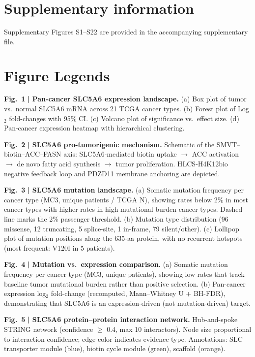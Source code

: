 \documentclass[10pt,letterpaper]{article}
\begin{document}
\section*{Supplementary information}
Supplementary Figures S1--S22 are provided in the accompanying supplementary file.


\clearpage
\section*{Figure Legends}

\noindent\textbf{Fig.~1} \textbf{| Pan-cancer SLC5A6 expression landscape.} (a) Box plot of tumor vs.\ normal SLC5A6 mRNA across 21 TCGA cancer types. (b) Forest plot of Log$_2$ fold-changes with 95\% CI. (c) Volcano plot of significance vs.\ effect size. (d) Pan-cancer expression heatmap with hierarchical clustering.

\noindent\textbf{Fig.~2} \textbf{| SLC5A6 pro-tumorigenic mechanism.} Schematic of the SMVT--biotin--ACC--FASN axis: SLC5A6-mediated biotin uptake $\rightarrow$ ACC activation $\rightarrow$ de novo fatty acid synthesis $\rightarrow$ tumor proliferation. HLCS-H4K12bio negative feedback loop and PDZD11 membrane anchoring are depicted.

\noindent\textbf{Fig.~3} \textbf{| SLC5A6 mutation landscape.} (a) Somatic mutation frequency per cancer type (MC3, unique patients / TCGA N), showing rates below 2\% in most cancer types with higher rates in high-mutational-burden cancer types. Dashed line marks the 2\% passenger threshold. (b) Mutation type distribution (96 missense, 12 truncating, 5 splice-site, 1 in-frame, 79 silent/other). (c) Lollipop plot of mutation positions along the 635-aa protein, with no recurrent hotspots (most frequent: V120I in 5 patients).

\noindent\textbf{Fig.~4} \textbf{| Mutation vs.\ expression comparison.} (a) Somatic mutation frequency per cancer type (MC3, unique patients), showing low rates that track baseline tumor mutational burden rather than positive selection. (b) Pan-cancer expression log$_2$ fold-change (recomputed, Mann--Whitney U + BH-FDR), demonstrating that SLC5A6 is an expression-driven (not mutation-driven) target.

\noindent\textbf{Fig.~5} \textbf{| SLC5A6 protein--protein interaction network.} Hub-and-spoke STRING network (confidence $\ge$ 0.4, max 10 interactors). Node size proportional to interaction confidence; edge color indicates evidence type. Annotations: SLC transporter module (blue), biotin cycle module (green), scaffold (orange).
\end{document}
